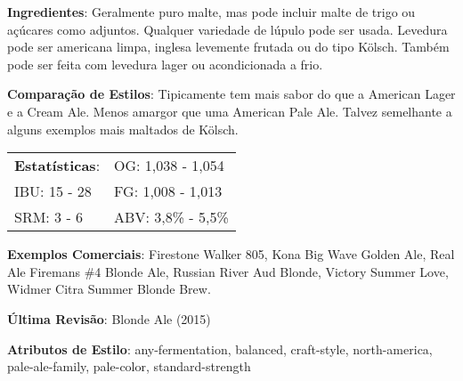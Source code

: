 \textbf{Ingredientes}: Geralmente puro malte, mas pode incluir malte de trigo ou açúcares como adjuntos. Qualquer variedade de lúpulo pode ser usada. Levedura pode ser americana limpa, inglesa levemente frutada ou do tipo Kölsch. Também pode ser feita com levedura lager ou acondicionada a frio.

\textbf{Comparação de Estilos}: Tipicamente tem mais sabor do que a American Lager e a Cream Ale. Menos amargor que uma American Pale Ale. Talvez semelhante a alguns exemplos mais maltados de Kölsch.

\begin{tabular}{@{}p{35mm}p{35mm}@{}}
  \textbf{Estatísticas}: & OG: 1,038 - 1,054 \\
  IBU: 15 - 28  & FG: 1,008 - 1,013  \\
  SRM: 3 - 6  & ABV: 3,8\% - 5,5\%
\end{tabular}

\textbf{Exemplos Comerciais}: Firestone Walker 805, Kona Big Wave Golden Ale, Real Ale Firemans \#4 Blonde Ale, Russian River Aud Blonde, Victory Summer Love, Widmer Citra Summer Blonde Brew.

\textbf{Última Revisão}: Blonde Ale (2015)

\textbf{Atributos de Estilo}: any-fermentation, balanced, craft-style, north-america, pale-ale-family, pale-color, standard-strength
